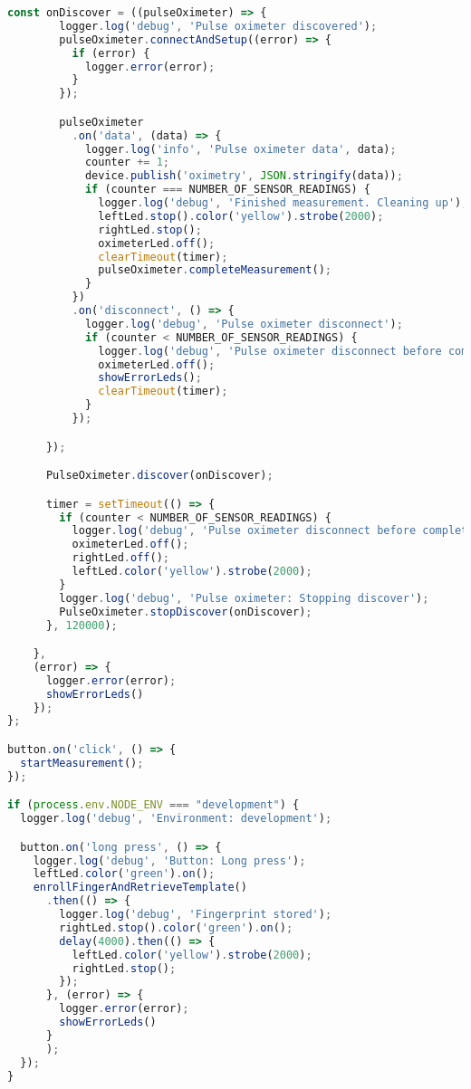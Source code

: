 \begin{lstlisting}[frame=single, language=JavaScript,
    caption=smart-pulse-oximeter: index.js, label=lst:smart-pulse-oximeter]
      const onDiscover = ((pulseOximeter) => {
        logger.log('debug', 'Pulse oximeter discovered');
        pulseOximeter.connectAndSetup((error) => {
          if (error) {
            logger.error(error);
          }
        });

        pulseOximeter
          .on('data', (data) => {
            logger.log('info', 'Pulse oximeter data', data);
            counter += 1;
            device.publish('oximetry', JSON.stringify(data));
            if (counter === NUMBER_OF_SENSOR_READINGS) {
              logger.log('debug', 'Finished measurement. Cleaning up');
              leftLed.stop().color('yellow').strobe(2000);
              rightLed.stop();
              oximeterLed.off();
              clearTimeout(timer);
              pulseOximeter.completeMeasurement();
            }
          })
          .on('disconnect', () => {
            logger.log('debug', 'Pulse oximeter disconnect');
            if (counter < NUMBER_OF_SENSOR_READINGS) {
              logger.log('debug', 'Pulse oximeter disconnect before completion');
              oximeterLed.off();
              showErrorLeds();
              clearTimeout(timer);
            }
          });

      });

      PulseOximeter.discover(onDiscover);

      timer = setTimeout(() => {
        if (counter < NUMBER_OF_SENSOR_READINGS) {
          logger.log('debug', 'Pulse oximeter disconnect before completion');
          oximeterLed.off();
          rightLed.off();
          leftLed.color('yellow').strobe(2000);
        }
        logger.log('debug', 'Pulse oximeter: Stopping discover');
        PulseOximeter.stopDiscover(onDiscover);
      }, 120000);

    },
    (error) => {
      logger.error(error);
      showErrorLeds()
    });
};

button.on('click', () => {
  startMeasurement();
});

if (process.env.NODE_ENV === "development") {
  logger.log('debug', 'Environment: development');

  button.on('long press', () => {
    logger.log('debug', 'Button: Long press');
    leftLed.color('green').on();
    enrollFingerAndRetrieveTemplate()
      .then(() => {
        logger.log('debug', 'Fingerprint stored');
        rightLed.stop().color('green').on();
        delay(4000).then(() => {
          leftLed.color('yellow').strobe(2000);
          rightLed.stop();
        });
      }, (error) => {
        logger.error(error);
        showErrorLeds()
      }
      );
  });
}
\end{lstlisting}

